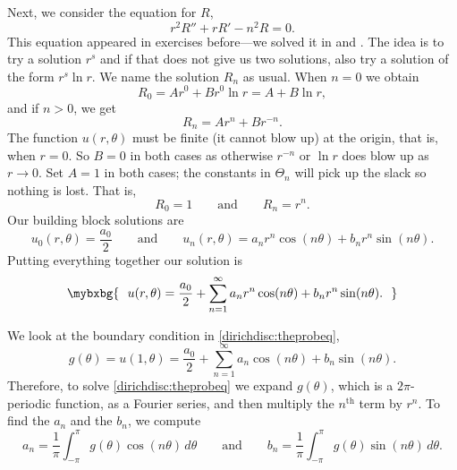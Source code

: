 Next, we consider the equation for $R$,
\begin{equation*}
r^2 R'' + r R' - n^2 R = 0.
\end{equation*}
This equation appeared in exercises before---we
solved it in 
and .  The idea is to try a solution
$r^s$ and if that does not give us two solutions, also try a solution of the form
$r^s \ln r$.  We name the solution $R_n$ as usual.  When $n=0$ we obtain
\begin{equation*}
R_0 = A r^0 + B r^0 \ln r = A + B \ln r ,
\end{equation*}
and if $n > 0$, we get
\begin{equation*}
R_n = A r^n + B r^{-n} .
\end{equation*}
The function $u(r,\theta)$ must be finite (it cannot blow up) at the origin, that is, when $r=0$.
So $B=0$ in both
cases as otherwise $r^{-n}$ or $\ln r$ does blow up as $r\to 0$.
Set $A=1$ in both cases; the constants in $\Theta_n$
will pick up the slack so nothing is lost.  That is,
\begin{equation*}
R_0 = 1
\qquad \text{and} \qquad
R_n = r^n .
\end{equation*}
Our building block solutions are
\begin{equation*}
u_0(r,\theta) = \frac{a_0}{2}
\qquad \text{and} \qquad
u_n(r,\theta) = a_n r^n \cos(n \theta) + b_n r^n \sin(n \theta) .
\end{equation*}
Putting everything together our solution is
\begin{equation*}
\mybxbg{~~
u(r,\theta)
=
\frac{a_0}{2} +
\sum_{n=1}^\infty
a_n r^n \cos(n \theta) + b_n r^n \sin(n \theta) .
~~}
\end{equation*}

We look at the boundary condition in \eqref{dirichdisc:theprobeq},
\begin{equation*}
g(\theta) = u(1,\theta)
=
\frac{a_0}{2} +
\sum_{n=1}^\infty
a_n \cos(n \theta) + b_n \sin(n \theta) .
\end{equation*}
Therefore, to solve \eqref{dirichdisc:theprobeq}
we expand $g(\theta)$, which is 
a $2\pi$-periodic function, as a Fourier series, and then 
multiply the $n^{\text{th}}$ term by $r^n$.  To
find the $a_n$ and the $b_n$, we compute
\begin{equation*}
a_n =
\frac{1}{\pi} \int_{-\pi}^\pi g(\theta) \cos (n\theta) \, d\theta \qquad
\text{and} \qquad
b_n =
\frac{1}{\pi} \int_{-\pi}^\pi g(\theta) \sin (n\theta) \, d\theta.
\end{equation*}

